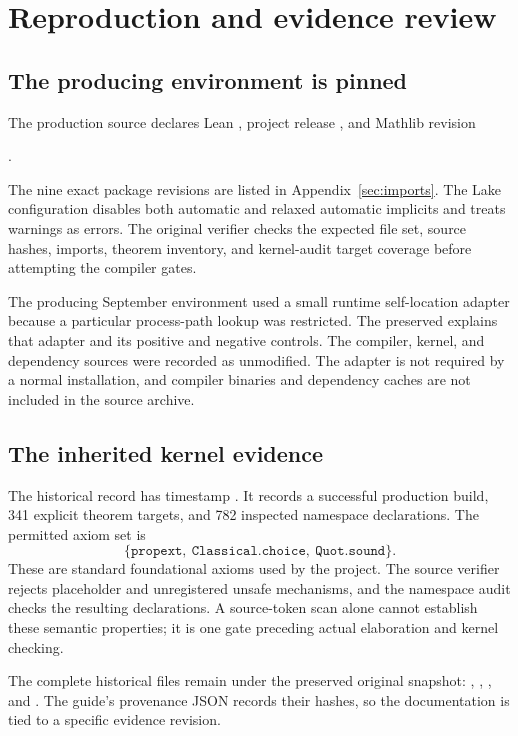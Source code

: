 \clearpage\section{Reproduction and evidence review}
\label{sec:reproduction}
\subsection{The producing environment is pinned}
The production source declares Lean , project release , and Mathlib revision
\begin{center}.\end{center}
The nine exact package revisions are listed in Appendix~\ref{sec:imports}. The Lake configuration disables both automatic and relaxed automatic implicits and treats warnings as errors. The original verifier checks the expected file set, source hashes, imports, theorem inventory, and kernel-audit target coverage before attempting the compiler gates.

The producing September environment used a small runtime self-location adapter because a particular process-path lookup was restricted. The preserved  explains that adapter and its positive and negative controls. The compiler, kernel, and dependency sources were recorded as unmodified. The adapter is not required by a normal installation, and compiler binaries and dependency caches are not included in the source archive.

\subsection{The inherited kernel evidence}
The historical record has timestamp . It records a successful production build, 341 explicit theorem targets, and 782 inspected namespace declarations. The permitted axiom set is
\[
\{\texttt{propext},\ \texttt{Classical.choice},\ \texttt{Quot.sound}\}.
\]
These are standard foundational axioms used by the project. The source verifier rejects placeholder and unregistered unsafe mechanisms, and the namespace audit checks the resulting declarations. A source-token scan alone cannot establish these semantic properties; it is one gate preceding actual elaboration and kernel checking.

The complete historical files remain under the preserved original snapshot: , , , and . The guide's provenance JSON records their hashes, so the documentation is tied to a specific evidence revision.


